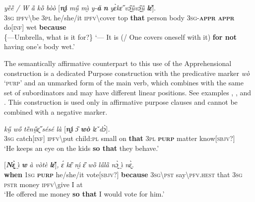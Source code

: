 \documentclass[output=paper,colorlinks,citecolor=brown]{langscibook}
\begin{document}
\ea \label{ex:Fed62}
\gll \textit{{\E}} \textit{yȅȅ} \textit{/} \textit{W} \textit{ȁ} \textit{kȍ} \textit{bòò} \textup{[}\textit{\textbf{nı̰́}} \textit{mṵ̋} \textit{mı̰̀} \textit{y-\textbf{ǎ}} \textit{\textbf{n{\ù}}} \textit{yɛ̀kɛ̋} \textit{vɔ̰̏ṵ̏vɔ̰̏ṵ̏} \textit{\textbf{lɛ̌}}\textup{]}. \\
\textsc{3sg} \textsc{ipfv\backslash}be {} \textsc{3pl} he/she/it \textsc{ipfv\backslash}cover top \textbf{that} person body \textsc{3sg-\textbf{appr}} \textbf{\textsc{appr}} do[\textsc{inf}] wet \textbf{because} \\
\glt \{---Umbrella, what is it for?\} `--- It is (/ One covers oneself with it) \textbf{for not} having one's body wet.'
\z


The semantically affirmative counterpart to this use of the Apprehensional construction is a dedicated Purpose construction with the  predicative marker \textit{wò} `\textsc{purp}' and an unmarked  form of the main verb, which combines with the same set of subordinators and may have different linear positions. See examples , , and . This construction is used only in affirmative purpose clauses and cannot be combined with a negative marker.

\ea \label{ex:Fed63}
\gll \textit{{\E}} \textit{kṵ̋} \textit{wő} \textit{tȅnṵ̋ɛ̰̋} \textit{sésé} \textit{là} \textup{[}\textit{\textbf{nı̰́}} \textit{ɔ̏} \textit{\textbf{wò}} \textit{lɛ̌} \textit{dɔ̀}\textup{]}\textit{.} \\
\textsc{3sg} catch[\textsc{inf}] \textsc{ipfv\backslash}put child:\textsc{pl} small on \textbf{that} \textsc{3pl} \textsc{\textbf{purp}} matter know[\textsc{sbjv?}]\footnotemark \\
\glt `He keeps an eye on the kids \textbf{so that} they behave.'
\z


\ea \label{ex:Fed64}
\gll \textup{[}\textit{\textbf{Nɛ̰̀}} \textit{ı̰̀} \textit{\textbf{w}} \textit{à} \textit{vòtè} \textit{\textbf{lɛ̌}}\textup{]}\textit{,} \textit{ɛ́} \textit{kɛ̏} \textit{nı̰́} \textit{ɛ̏} \textit{wȍ} \textit{la̋lȁ} \textit{nɔ̰̀} \textit{ı̰̀} \textit{nɛ̰̀.} \\
\textbf{when} \textsc{1sg} \textsc{\textbf{purp}} he/she/it vote[\textsc{sbjv?}] \textbf{because} \textsc{3sg\backslash pst} say\backslash\textsc{pfv.hest} that \textsc{3sg} \textsc{pstr} money \textsc{ipfv\backslash}give I at \\
\glt `He offered me money \textbf{so that} I would vote for him.'
\z
\end{document}
